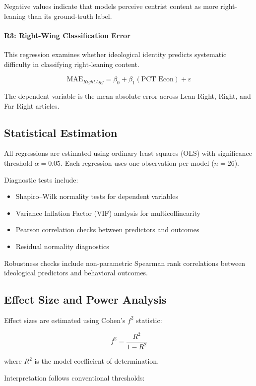\documentclass[11pt]{article}
\begin{document}
Negative values indicate that models perceive centrist content as more right-leaning than its ground-truth label.

\paragraph{R3: Right-Wing Classification Error}

This regression examines whether ideological identity predicts systematic difficulty in classifying right-leaning content.

\[
\text{MAE}_{RightAgg}
=
\beta_0
+\beta_1(\text{PCT Econ})
+\varepsilon
\]

The dependent variable is the mean absolute error across Lean Right, Right, and Far Right articles.

\subsection{Statistical Estimation}

All regressions are estimated using ordinary least squares (OLS) with significance threshold $\alpha = 0.05$. Each regression uses one observation per model ($n=26$).

Diagnostic tests include:

\begin{itemize}
\item Shapiro–Wilk normality tests for dependent variables
\item Variance Inflation Factor (VIF) analysis for multicollinearity
\item Pearson correlation checks between predictors and outcomes
\item Residual normality diagnostics
\end{itemize}

Robustness checks include non-parametric Spearman rank correlations between ideological predictors and behavioral outcomes.

\subsection{Effect Size and Power Analysis}

Effect sizes are estimated using Cohen's $f^2$ statistic:

\[
f^2 = \frac{R^2}{1-R^2}
\]

where $R^2$ is the model coefficient of determination.

Interpretation follows conventional thresholds:
\end{document}
